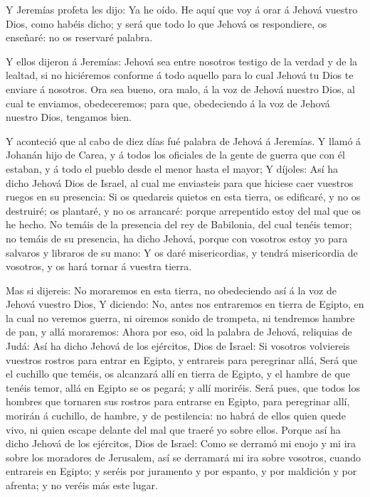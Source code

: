 Y Jeremías profeta les dijo: Ya he oído. He aquí que voy á
orar á Jehová vuestro Dios, como habéis dicho; y será que todo lo que
Jehová os respondiere, os enseñaré: no os reservaré palabra.

 Y ellos dijeron á Jeremías: Jehová sea entre nosotros
testigo de la verdad y de la lealtad, si no hiciéremos conforme á todo
aquello para lo cual Jehová tu Dios te enviare á nosotros. 
Ora sea bueno, ora malo, á la voz de Jehová nuestro Dios, al cual te
enviamos, obedeceremos; para que, obedeciendo á la voz de Jehová nuestro
Dios, tengamos bien.

 Y aconteció que al cabo de diez días fué palabra de Jehová
á Jeremías.  Y llamó á Johanán hijo de Carea, y á todos los
oficiales de la gente de guerra que con él estaban, y á todo el pueblo
desde el menor hasta el mayor;  Y díjoles: Así ha dicho
Jehová Dios de Israel, al cual me enviasteis para que hiciese caer
vuestros ruegos en su presencia:  Si os quedareis quietos
en esta tierra, os edificaré, y no os destruiré; os plantaré, y no os
arrancaré: porque arrepentido estoy del mal que os he hecho.
 No temáis de la presencia del rey de Babilonia, del cual
tenéis temor; no temáis de su presencia, ha dicho Jehová, porque con
vosotros estoy yo para salvaros y libraros de su mano:  Y
os daré misericordias, y tendrá misericordia de vosotros, y os hará
tornar á vuestra tierra.

 Mas si dijereis: No moraremos en esta tierra, no
obedeciendo así á la voz de Jehová vuestro Dios,  Y
diciendo: No, antes nos entraremos en tierra de Egipto, en la cual no
veremos guerra, ni oiremos sonido de trompeta, ni tendremos hambre de
pan, y allá moraremos:  Ahora por eso, oid la palabra de
Jehová, reliquias de Judá: Así ha dicho Jehová de los ejércitos, Dios de
Israel: Si vosotros volviereis vuestros rostros para entrar en Egipto, y
entrareis para peregrinar allá,  Será que el cuchillo que
teméis, os alcanzará allí en tierra de Egipto, y el hambre de que tenéis
temor, allá en Egipto se os pegará; y allí moriréis.  Será
pues, que todos los hombres que tornaren sus rostros para entrarse en
Egipto, para peregrinar allí, morirán á cuchillo, de hambre, y de
pestilencia: no habrá de ellos quien quede vivo, ni quien escape delante
del mal que traeré yo sobre ellos.  Porque así ha dicho
Jehová de los ejércitos, Dios de Israel: Como se derramó mi enojo y mi
ira sobre los moradores de Jerusalem, así se derramará mi ira sobre
vosotros, cuando entrareis en Egipto; y seréis por juramento y por
espanto, y por maldición y por afrenta; y no veréis más este lugar.

